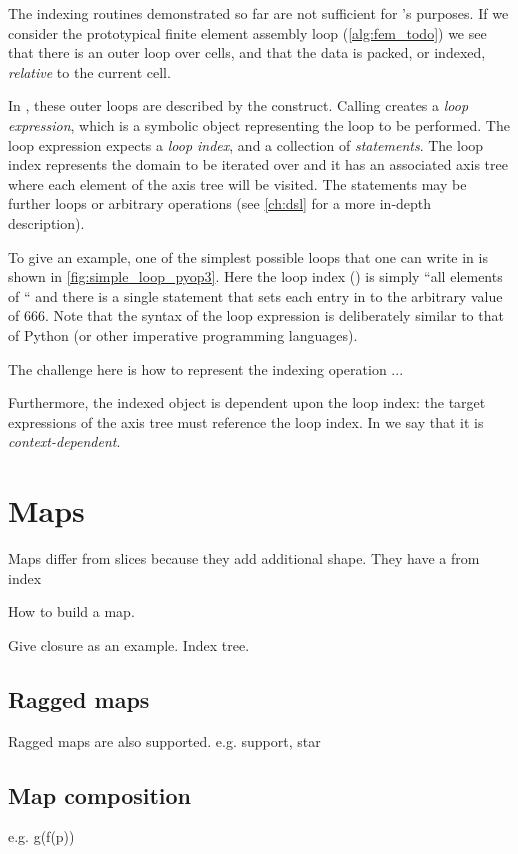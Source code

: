 \documentclass[thesis]{subfiles}
\begin{document}
The indexing routines demonstrated so far are not sufficient for 's purposes.
If we consider the prototypical finite element assembly loop (\cref{alg:fem_todo}) we see that there is an outer loop over cells, and that the data is packed, or indexed, \textit{relative} to the current cell.

In , these outer loops are described by the  construct.
Calling  creates a \textit{loop expression}, which is a symbolic object representing the loop to be performed.
The loop expression expects a \textit{loop index}, and a collection of \textit{statements}.
The loop index represents the domain to be iterated over and it has an associated axis tree where each element of the axis tree will be visited.
The statements may be further loops or arbitrary operations (see \cref{ch:dsl} for a more in-depth description).

To give an example, one of the simplest possible loops that one can write in  is shown in \cref{fig:simple_loop_pyop3}.
Here the loop index () is simply ``all elements of `` and there is a single statement that sets each entry in  to the arbitrary value of 666.
Note that the syntax of the loop expression is deliberately similar to that of Python (or other imperative programming languages).

The challenge here is how to represent the indexing operation ...


Furthermore, the indexed object is dependent upon the loop index: the target expressions of the axis tree must reference the loop index.
In  we say that it is \textit{context-dependent}.



\section{Maps}

Maps differ from slices because they add additional shape. They have a from index

How to build a map.

Give closure as an example. Index tree.

\subsection{Ragged maps}

Ragged maps are also supported. e.g. support, star

\subsection{Map composition}

e.g. g(f(p))
\end{document}
